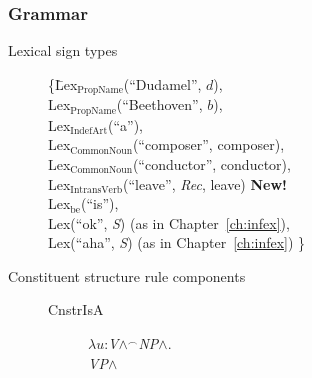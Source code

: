 \subsubsection{Grammar} 

\begin{description}



\item[Lexical sign types] \mbox{}

\begin{tabbing}
    \{\=Lex$_{\mathrm{PropName}}$(``Dudamel'', $d$), \\
\> Lex$_{\mathrm{PropName}}$(``Beethoven'', $b$), \\
\> Lex$_{\mathrm{IndefArt}}$(``a''), \\
\> Lex$_{\text{CommonNoun}}$(``composer'', composer), \\
\> Lex$_{\text{CommonNoun}}$(``conductor'', conductor), \\
\> Lex$_{\mathrm{IntransVerb}}$(``leave'', \textit{Rec}, leave)
\textbf{New!} \\
\> Lex$_{\mathrm{be}}$(``is''), \\
\> Lex(``ok'', \textit{S}) (as in Chapter~\ref{ch:infex}),  \\
\> Lex(``aha'', \textit{S}) (as in Chapter~\ref{ch:infex}) \}
\end{tabbing}

\item[Constituent structure rule components] \mbox{}
  \begin{description}

    \item[\textnormal{CnstrIsA}] \mbox{}

  $\lambda
u$:\textit{V}\d{$\wedge$}$^{\frown}$\textit{NP}\d{$\wedge$}. \\
\hspace*{1em} \textit{VP}\d{$\wedge$} 

  \end{description}
  



\end{description}
